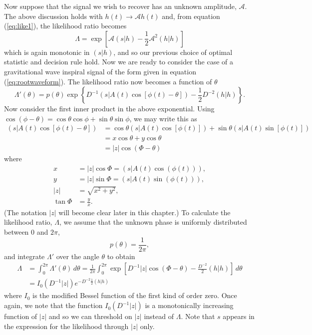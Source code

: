 Now suppose that the signal we wish to recover has an unknown amplitude,
$\mathcal{A}$. The above discussion holds with $h(t) \rightarrow
\mathcal{A}h(t)$ and, from equation (\ref{eq:like1}), the likelihood ratio becomes
\begin{equation}
\Lambda = \exp\left[\mathcal{A}(s|h) - \frac{1}{2}\mathcal{A}^2(h|h)\right]
\end{equation}
which is again monotonic in $(s|h)$, and so our previous choice of optimal
statistic and decision rule hold. Now we are ready to consider the case of a
gravitational wave inspiral signal of the form given in equation
(\ref{eq:rootwaveform}).  The likelihood ratio now becomes a function of
$\theta$
\begin{equation}
\Lambda'(\theta) = 
p(\theta) \exp\left\{D^{-1}(s|A(t)\cos\left[\phi(t) - \theta\right]) -
\frac{1}{2}D^{-2}(h|h)\right\}.
\end{equation}
Now consider the first inner product in the above exponential. Using
$\cos(\phi - \theta) = \cos\theta\cos\phi + \sin\theta\sin\phi$, we may write
this as
\begin{equation}
\begin{split}
\left(s\big|A(t)\cos\left[\phi(t) - \theta\right]\right)  &= 
\cos\theta \left(s\big|A(t)\cos\left[\phi(t)\right]\right) + 
\sin\theta \left(s\big|A(t)\sin\left[\phi(t)\right]\right)  \\
& = x\cos\theta + y\cos\theta \\
& = |z|\cos(\Phi - \theta)
\end{split}
\end{equation}
where
\begin{align}
x &= |z|\cos\Phi = \left(s\big|A(t)\cos(\phi(t))\right), \\
y &= |z|\sin\Phi = \left(s\big|A(t)\sin(\phi(t))\right), \\
|z| &= \sqrt{x^2 + y^2}, \\
\tan \Phi &= \frac{y}{x}.
\end{align}
(The notation $|z|$ will become clear later in this chapter.) To calculate the
likelihood ratio, $\Lambda$, we assume that the unknown phase is uniformly
distributed between $0$ and $2\pi$,
\begin{equation}
p(\theta) = \frac{1}{2\pi},
\end{equation}
and integrate $\Lambda'$ over the angle $\theta$ to obtain
\begin{equation}
\begin{split}
\Lambda &= \int_0^{2\pi} \Lambda'(\theta) \,d\theta
= \frac{1}{2\pi}\int_0^{2\pi}\exp\left[D^{-1}|z|\cos(\Phi - \theta) -
\frac{D^{-2}}{2}(h|h)\right] \,d\theta \\
&= I_0(D^{-1}|z|) e^{-D^{-2}\frac{1}{2}(h|h)}
\end{split}
\end{equation}
where $I_0$ is the modified Bessel function of the first kind of order zero.
Once again, we note that the function $I_0(D^{-1}|z|)$ is a monotonically
increasing function of $|z|$ and so we can threshold on $|z|$ instead of
$\Lambda$. Note that $s$ appears in the expression for the likelihood through
$|z|$ only.

